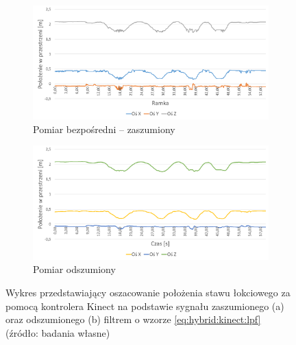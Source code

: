 	
\begin{savenotes}
	\begin{figure}[!htb]
		\centering
		\begin{subfigure}[b]{\textwidth}
			\centering
			\includegraphics[width=\textwidth]{images/kinectElbowRaw.png}	
			\caption{Pomiar bezpośredni -- zaszumiony}
			\label{fig:hybrid:kinect:noised}
		\end{subfigure}
		\begin{subfigure}[b]{\textwidth}
			\centering
			\includegraphics[width=\textwidth]{images/kinectElbowFiltered.png}	
			\caption{Pomiar odszumiony}
			\label{fig:hybrid:kinect:denoised}
		\end{subfigure}				
		\caption[Wykres przedstawiający oszacowanie położenia stawu łokciowego za pomocą kontrolera Kinect na podstawie sygnału zaszumionego oraz odszumionego]{Wykres przedstawiający oszacowanie położenia stawu łokciowego za pomocą kontrolera Kinect na podstawie sygnału zaszumionego (a) oraz odszumionego (b) filtrem o wzorze \ref{eq:hybrid:kinect:lpf} (źródło: badania własne)}
	\end{figure}
\end{savenotes}
								
